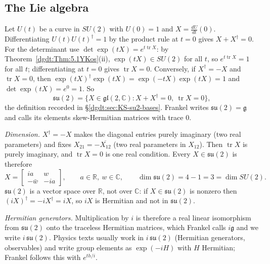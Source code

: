 \subsection{The Lie algebra}
Let $U(t)$ be a curve in $SU(2)$ with $U(0)=1$ and $X=\frac{dU}{dt}(0)$.
Differentiating $U(t)U(t)^\dagger=1$ by the product rule at $t=0$ gives
$X+X^\dagger=0$. For the determinant use
$\det\exp(tX)=e^{t\operatorname{tr}X}$: by
Theorem~\ref{dgdt:Thm:5.1YKos}(ii), $\exp(tX)\in SU(2)$ for all $t$, so
$e^{t\operatorname{tr}X}=1$ for all $t$; differentiating at $t=0$ gives
$\operatorname{tr}X=0$. Conversely, if $X^\dagger=-X$ and
$\operatorname{tr}X=0$, then $\exp(tX)^\dagger\exp(tX)=\exp(-tX)\exp(tX)=1$
and $\det\exp(tX)=e^0=1$. So
\begin{equation}\label{quat:su2-def}
 \mathfrak{su}(2)=\{X\in\mathfrak{gl}(2,\mathbb C):X+X^\dagger=0,\
 \operatorname{tr}X=0\},
\end{equation}
the definition recorded in \S\ref{dgdt:sec:KS-su2-bases}. Frankel writes
$\mathfrak{su}(2)=\mathfrak g$ and calls its elements skew-Hermitian
matrices with trace $0$.

\emph{Dimension.} $X^\dagger=-X$ makes the diagonal entries purely
imaginary (two real parameters) and fixes $X_{21}=-\overline{X_{12}}$ (two
real parameters in $X_{12}$). Then $\operatorname{tr}X$ is purely imaginary,
and $\operatorname{tr}X=0$ is one real condition. Every
$X\in\mathfrak{su}(2)$ is therefore
\begin{equation}\label{quat:su2-general-X}
 X=\begin{bmatrix}ia&w\\-\bar w&-ia\end{bmatrix},\qquad a\in\mathbb R,\
 w\in\mathbb C,\qquad \dim\mathfrak{su}(2)=4-1=3=\dim SU(2).
\end{equation}
$\mathfrak{su}(2)$ is a vector space over $\mathbb R$, not over
$\mathbb C$: if $X\in\mathfrak{su}(2)$ is nonzero then
$(iX)^\dagger=-iX^\dagger=iX$, so $iX$ is Hermitian and not in
$\mathfrak{su}(2)$.

\emph{Hermitian generators.} Multiplication by $i$ is therefore a real
linear isomorphism from $\mathfrak{su}(2)$ onto the traceless Hermitian
matrices, which Frankel calls $i\mathfrak g$ and we write
$i\,\mathfrak{su}(2)$. Physics texts usually work in
$i\,\mathfrak{su}(2)$ (Hermitian generators, observables) and write group
elements as $\exp(-iH)$ with $H$ Hermitian; Frankel follows this with
$e^{th/i}$.

